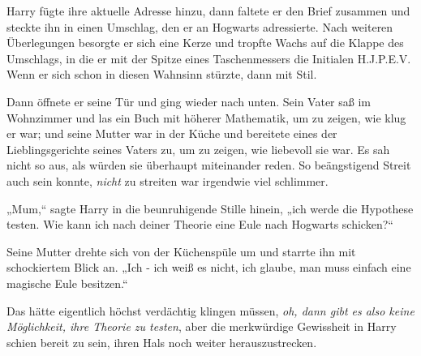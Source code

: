 Harry fügte ihre aktuelle Adresse hinzu, dann faltete er den Brief zusammen und steckte ihn in einen Umschlag, den er an Hogwarts adressierte. Nach weiteren Überlegungen besorgte er sich eine Kerze und tropfte Wachs auf die Klappe des Umschlags, in die er mit der Spitze eines Taschenmessers die Initialen H.J.P.E.V\@. Wenn er sich schon in diesen Wahnsinn stürzte, dann mit Stil.

Dann öffnete er seine Tür und ging wieder nach unten. Sein Vater saß im Wohnzimmer und las ein Buch mit höherer Mathematik, um zu zeigen, wie klug er war; und seine Mutter war in der Küche und bereitete eines der Lieblingsgerichte seines Vaters zu, um zu zeigen, wie liebevoll sie war. Es sah nicht so aus, als würden sie überhaupt miteinander reden. So beängstigend Streit auch sein konnte, \emph{nicht} zu streiten war irgendwie viel schlimmer.

„Mum,“ sagte Harry in die beunruhigende Stille hinein, „ich werde die Hypothese testen. Wie kann ich nach deiner Theorie eine Eule nach Hogwarts schicken?“

Seine Mutter drehte sich von der Küchenspüle um und starrte ihn mit schockiertem Blick an. „Ich - ich weiß es nicht, ich glaube, man muss einfach eine magische Eule besitzen.“

Das hätte eigentlich höchst verdächtig klingen müssen, \emph{oh, dann gibt es also keine Möglichkeit, ihre Theorie zu testen}, aber die merkwürdige Gewissheit in Harry schien bereit zu sein, ihren Hals noch weiter herauszustrecken.

